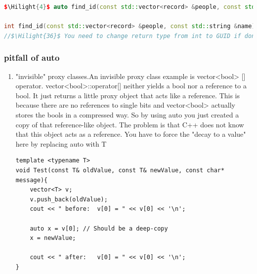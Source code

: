 \documentclass[a4paper,12pt,twoside]{book}
\newcommand{\Hilight}[1]{\makebox[0pt][l]{\color{yellow}\rule[-3pt]{#1em}{11pt}}}
\begin{document}
\begin{itemize}
\begin{enumerate}
\begin{lstlisting}[frame=single, language=c++, mathescape=true]
$\Hilight{4}$ auto find_id(const std::vector<record> &people, const std::string &name)

int find_id(const std::vector<record> &people, const std::string &name)
//$\Hilight{36}$ You need to change return type from int to GUID if don't use auto
\end{lstlisting}

	\end{enumerate}
\end{itemize}
	
\subsubsection{pitfall of auto}
	\begin{enumerate}
		\item "invisible" proxy classes.An invisible proxy class example is vector<bool> [] operator. vector<bool>::operator[] neither yields a bool nor a reference to a bool. It just returns a little proxy object that acts like a reference. This is because there are no references to single bits and vector<bool> actually stores the bools in a compressed way. So by using auto you just created a copy of that reference-like object. The problem is that C++ does not know that this object acts as a reference. You have to force the "decay to a value" here by replacing auto with T
\begin{lstlisting}
template <typename T>
void Test(const T& oldValue, const T& newValue, const char* message){
	vector<T> v;
	v.push_back(oldValue);
	cout << " before:  v[0] = " << v[0] << '\n';
	
	auto x = v[0]; // Should be a deep-copy
	x = newValue;

	cout << " after:   v[0] = " << v[0] << '\n';
}


\end{lstlisting}
\end{enumerate}
\end{document}
